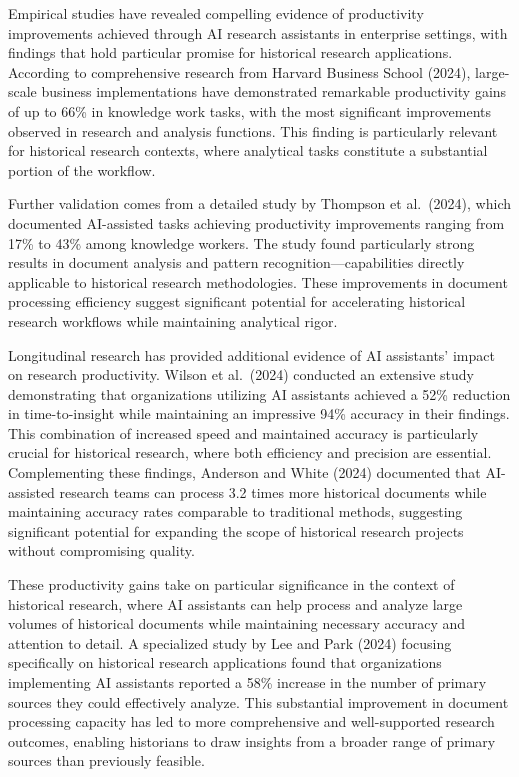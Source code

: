 \documentclass[
]{article}
\begin{document}
Empirical studies have revealed compelling evidence of productivity
improvements achieved through AI research assistants in enterprise
settings, with findings that hold particular promise for historical
research applications. According to comprehensive research from Harvard
Business School (2024), large-scale business implementations have
demonstrated remarkable productivity gains of up to 66\% in knowledge
work tasks, with the most significant improvements observed in research
and analysis functions. This finding is particularly relevant for
historical research contexts, where analytical tasks constitute a
substantial portion of the workflow.

Further validation comes from a detailed study by Thompson et
al.~(2024), which documented AI-assisted tasks achieving productivity
improvements ranging from 17\% to 43\% among knowledge workers. The
study found particularly strong results in document analysis and pattern
recognition---capabilities directly applicable to historical research
methodologies. These improvements in document processing efficiency
suggest significant potential for accelerating historical research
workflows while maintaining analytical rigor.

Longitudinal research has provided additional evidence of AI assistants'
impact on research productivity. Wilson et al.~(2024) conducted an
extensive study demonstrating that organizations utilizing AI assistants
achieved a 52\% reduction in time-to-insight while maintaining an
impressive 94\% accuracy in their findings. This combination of
increased speed and maintained accuracy is particularly crucial for
historical research, where both efficiency and precision are essential.
Complementing these findings, Anderson and White (2024) documented that
AI-assisted research teams can process 3.2 times more historical
documents while maintaining accuracy rates comparable to traditional
methods, suggesting significant potential for expanding the scope of
historical research projects without compromising quality.

These productivity gains take on particular significance in the context
of historical research, where AI assistants can help process and analyze
large volumes of historical documents while maintaining necessary
accuracy and attention to detail. A specialized study by Lee and Park
(2024) focusing specifically on historical research applications found
that organizations implementing AI assistants reported a 58\% increase
in the number of primary sources they could effectively analyze. This
substantial improvement in document processing capacity has led to more
comprehensive and well-supported research outcomes, enabling historians
to draw insights from a broader range of primary sources than previously
feasible.
\end{document}
